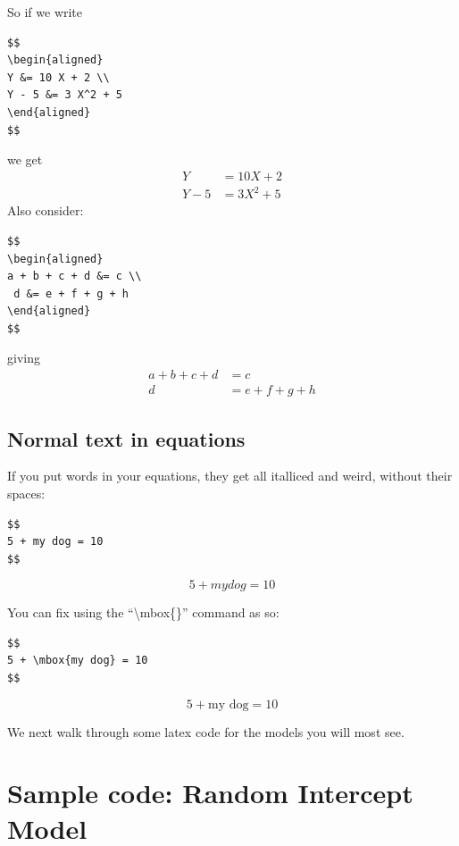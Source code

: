 \documentclass[
  letterpaper,
  DIV=11,
  numbers=noendperiod]{scrreprt}
\begin{document}
So if we write

\begin{verbatim}
$$
\begin{aligned}
Y &= 10 X + 2 \\
Y - 5 &= 3 X^2 + 5
\end{aligned}
$$
\end{verbatim}

we get \[
\begin{aligned}
Y &= 10 X + 2 \\
Y - 5 &= 3 X^2 + 5
\end{aligned}
\] Also consider:

\begin{verbatim}
$$
\begin{aligned}
a + b + c + d &= c \\
 d &= e + f + g + h 
\end{aligned}
$$
\end{verbatim}

giving \[
\begin{aligned}
a + b + c + d &= c \\
 d &= e + f + g + h 
\end{aligned}
\]

\hypertarget{normal-text-in-equations}{%
\subsection{Normal text in equations}\label{normal-text-in-equations}}

If you put words in your equations, they get all italliced and weird,
without their spaces:

\begin{verbatim}
$$
5 + my dog = 10
$$
\end{verbatim}

\[
5 + my dog = 10
\]

You can fix using the ``\textbackslash mbox\{\}'' command as so:

\begin{verbatim}
$$
5 + \mbox{my dog} = 10
$$
\end{verbatim}

\[
5 + \mbox{my dog} = 10
\]

We next walk through some latex code for the models you will most see.

\hypertarget{sample-code-random-intercept-model}{%
\section{Sample code: Random Intercept
Model}\label{sample-code-random-intercept-model}}
\end{document}
